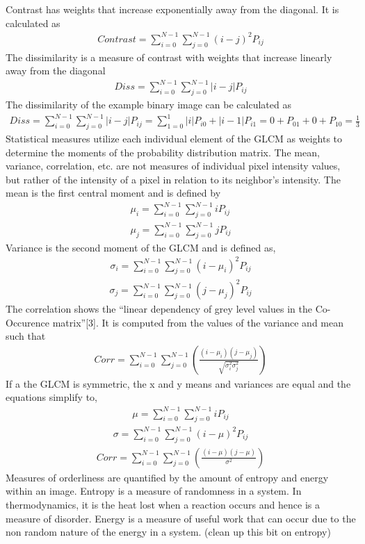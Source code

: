 Contrast has weights that increase exponentially away from the diagonal.  It is calculated as
%
\begin{align}
    Contrast = \sum_{i=0}^{N-1}\sum_{j=0}^{N-1}(i-j)^2P_{ij}
\end{align}
%
The dissimilarity is a measure of contrast with weights that increase linearly away from the diagonal
%
\begin{align}
    Diss = \sum_{i=0}^{N-1}\sum_{j=0}^{N-1}|i-j|P_{ij}
\end{align}
%
The dissimilarity of the example binary image can be calculated as
%
\begin{align}
    Diss = \sum_{i=0}^{N-1}\sum_{j=0}^{N-1}|i-j|P_{ij}
    = \sum_{1=0}^{1}|i|P_{i0}+|i-1|P_{i1}
    = 0 + P_{01} + 0 + P_{10} = \frac{1}{3}
\end{align}
%
Statistical measures utilize each individual element of the GLCM as weights to determine the moments of the probability distribution matrix. The mean, variance, correlation, etc. are not measures of individual pixel intensity values, but rather of the intensity of a pixel in relation to its neighbor’s intensity. The mean is the first central moment and is defined by
%
\begin{align}
    \mu_i = \sum_{i=0}^{N-1}\sum_{j=0}^{N-1}iP_{ij} \\
    \mu_j = \sum_{i=0}^{N-1}\sum_{j=0}^{N-1}jP_{ij}
\end{align}
%
Variance is the second moment of the GLCM and is defined as,
%
\begin{align}
    \sigma_i = \sum_{i=0}^{N-1}\sum_{j=0}^{N-1}(i-\mu_i)^2P_{ij}
\end{align}
\begin{align}
    \sigma_j = \sum_{i=0}^{N-1}\sum_{j=0}^{N-1}(j-\mu_j)^2P_{ij}
\end{align}
%
The correlation shows the “linear dependency of grey level values in the Co-Occurence matrix”[3].  It is computed from the values of the variance and mean such that
%
\begin{align}
    Corr = \sum_{i=0}^{N-1}\sum_{j=0}^{N-1}(\frac{(i-\mu_i)(j-\mu_j)}{\sqrt{\sigma_i^2 \sigma_j^2}})
\end{align}
%
If a the GLCM is symmetric, the x and y means and variances are equal and the equations simplify to,
%
\begin{align}
    \mu = \sum_{i=0}^{N-1}\sum_{j=0}^{N-1}iP_{ij}
\end{align}
\begin{align}
    \sigma = \sum_{i=0}^{N-1}\sum_{j=0}^{N-1}(i-\mu)^2P_{ij}
\end{align}
\begin{align}
    Corr = \sum_{i=0}^{N-1}\sum_{j=0}^{N-1}(\frac{(i-\mu)(j-\mu)}{\sigma^2})
\end{align}
%
Measures of orderliness are quantified by the amount of entropy and energy within an image.  Entropy is a measure of randomness in a system.  In thermodynamics, it is the heat lost when a reaction occurs and hence is a measure of disorder.  Energy is a measure of useful work that can occur due to the non random nature of the energy in a system. (clean up this bit on entropy)


